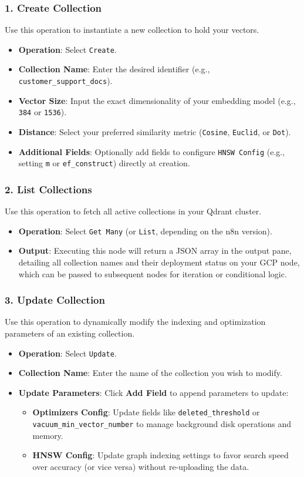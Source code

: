 \documentclass[11pt,a4paper]{article}
\begin{document}
\subsubsection{1. Create Collection}
Use this operation to instantiate a new collection to hold your vectors.
\begin{itemize}
    \item \textbf{Operation}: Select \texttt{Create}.
    \item \textbf{Collection Name}: Enter the desired identifier (e.g., \texttt{customer\_support\_docs}).
    \item \textbf{Vector Size}: Input the exact dimensionality of your embedding model (e.g., \texttt{384} or \texttt{1536}).
    \item \textbf{Distance}: Select your preferred similarity metric (\texttt{Cosine}, \texttt{Euclid}, or \texttt{Dot}).
    \item \textbf{Additional Fields}: Optionally add fields to configure \texttt{HNSW Config} (e.g., setting \texttt{m} or \texttt{ef\_construct}) directly at creation.
\end{itemize}

\subsubsection{2. List Collections}
Use this operation to fetch all active collections in your Qdrant cluster.
\begin{itemize}
    \item \textbf{Operation}: Select \texttt{Get Many} (or \texttt{List}, depending on the n8n version).
    \item \textbf{Output}: Executing this node will return a JSON array in the output pane, detailing all collection names and their deployment status on your GCP node, which can be passed to subsequent nodes for iteration or conditional logic.
\end{itemize}

\subsubsection{3. Update Collection}
Use this operation to dynamically modify the indexing and optimization parameters of an existing collection.
\begin{itemize}
    \item \textbf{Operation}: Select \texttt{Update}.
    \item \textbf{Collection Name}: Enter the name of the collection you wish to modify.
    \item \textbf{Update Parameters}: Click \textbf{Add Field} to append parameters to update:
    \begin{itemize}
        \item \textbf{Optimizers Config}: Update fields like \texttt{deleted\_threshold} or \texttt{vacuum\_min\_vector\_number} to manage background disk operations and memory.
        \item \textbf{HNSW Config}: Update graph indexing settings to favor search speed over accuracy (or vice versa) without re-uploading the data.
    \end{itemize}
\end{itemize}
\end{document}
